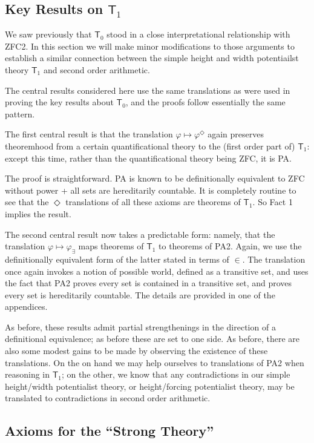 \documentclass{article}
\begin{document}
\subsection{Key Results on $\mathsf{T}_1$}
We saw previously that $\mathsf{T}_0$ stood in a close interpretational relationship 
with ZFC2. In this section we will make minor modifications to those arguments 
to establish a similar connection between the simple height and width potentiailst 
theory $\mathsf{T}_1$ and second order arithmetic.

The central results considered here use the same translations as were used in 
proving the key results about $\mathsf{T}_0$, and the proofs follow essentially the 
same pattern. 

The first central result is that the translation $\varphi \mapsto \varphi^\Diamond$ 
again preserves theoremhood from a certain quantificational theory 
to the (first order part of) $\mathsf{T}_1$: except this time, 
rather than the quantificational theory 
being ZFC, it is PA. 

The proof is straightforward. PA is known to be definitionally equivalent to 
ZFC without power + all sets are hereditarily countable. It is completely 
routine to see that the $\Diamond$ translations of all these axioms are theorems 
of $\mathsf{T}_1$. So Fact 1 implies the result. 

The second central result now takes a predictable form: namely, that the 
translation $\varphi \mapsto \varphi_\exists$ maps theorems of $\mathsf{T}_1$ 
to theorems of PA2. Again, we use the definitionally equivalent form of the latter 
stated in terms of $\in$. The translation once again invokes a notion of possible 
world, defined as a transitive set, and uses the fact that PA2 proves every set is 
contained in a transitive set, and proves every set is hereditarily countable. 
The details are provided in one of the appendices.

As before, these results admit partial strengthenings in the direction of a definitional
equivalence; as before these are set to one side. As before, there are also 
some modest gains to be made by observing the existence of these translations. 
On the on hand we may help ourselves to translations of PA2 when reasoning in $\mathsf{T}_1$;
on the other, we know that any contradictions in our simple height/width potentialist theory,
or height/forcing potentialist theory, may be translated to contradictions in 
second order arithmetic.

\subsection{Axioms for the ``Strong Theory''}
\end{document}

